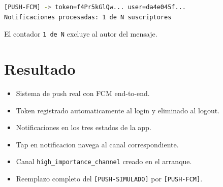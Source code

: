 \begin{lstlisting}[language=bash]
[PUSH-FCM] -> token=f4Pr5kGlQw... user=da4e045f...
Notificaciones procesadas: 1 de N suscriptores
\end{lstlisting}

El contador \texttt{1 de N} excluye al autor del mensaje.

\section{Resultado}

\begin{exito}
\begin{itemize}[leftmargin=*]
  \item Sistema de push real con FCM end-to-end.
  \item Token registrado automaticamente al login y eliminado al logout.
  \item Notificaciones en los tres estados de la app.
  \item Tap en notificacion navega al canal correspondiente.
  \item Canal \texttt{high\_importance\_channel} creado en el arranque.
  \item Reemplazo completo del \texttt{[PUSH-SIMULADO]} por \texttt{[PUSH-FCM]}.
\end{itemize}
\end{exito}
